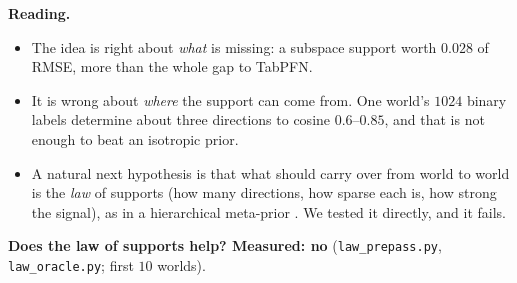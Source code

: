 \documentclass[11pt]{article}
\theoremstyle{definition}
\theoremstyle{remark}
\begin{document}
\textbf{Reading.}
\begin{itemize}
  \item The idea is right about \emph{what} is missing: a subspace support worth $0.028$ of RMSE, more than the whole gap to TabPFN.
  \item It is wrong about \emph{where} the support can come from. One world's $1024$ binary labels determine about three directions to cosine $0.6$--$0.85$, and that is not enough to beat an isotropic prior.
  \item A natural next hypothesis is that what should carry over from world to world is the \emph{law} of supports (how many directions, how sparse each is, how strong the signal), as in a hierarchical meta-prior \cite{baxter00}. We tested it directly, and it fails.
\end{itemize}
\textbf{Does the law of supports help? Measured: no} (\texttt{law\_prepass.py}, \texttt{law\_oracle.py}; first $10$ worlds).
\end{document}
